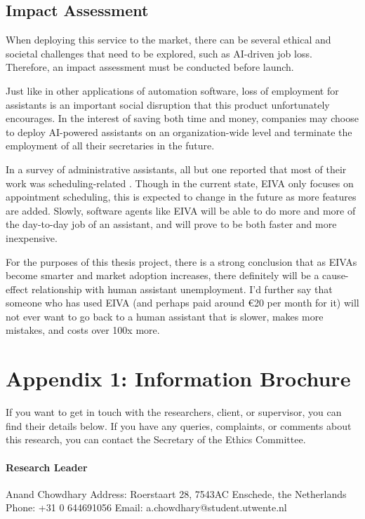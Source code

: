 \documentclass{article}
\begin{document}
\subsection{Impact Assessment}

When deploying this service to the market, there can be several ethical and societal challenges that need to be explored, such as AI-driven job loss. Therefore, an impact assessment must be conducted before launch.

Just like in other applications of automation software, loss of employment for assistants is an important social disruption that this product unfortunately encourages. In the interest of saving both time and money, companies may choose to deploy AI-powered assistants on an organization-wide level and terminate the employment of all their secretaries in the future.

In a survey of administrative assistants, all but one reported that most of their work was scheduling-related \cite{erickson_assistance:_2008}. Though in the current state, EIVA only focuses on appointment scheduling, this is expected to change in the future as more features are added. Slowly, software agents like EIVA will be able to do more and more of the day-to-day job of an assistant, and will prove to be both faster and more inexpensive.

For the purposes of this thesis project, there is a strong conclusion that as EIVAs become smarter and market adoption increases, there definitely will be a cause-effect relationship with human assistant unemployment. I'd further say that someone who has used EIVA (and perhaps paid around €20 per month for it) will not ever want to go back to a human assistant that is slower, makes more mistakes, and costs over 100x more.

\newpage

\cleardoublepage
{}
\setcounter{page}{\thesavepage}

\section*{Appendix 1: Information Brochure}

If you want to get in touch with the researchers, client, or supervisor, you can find their details below. If you have any queries, complaints, or comments about this research, you can contact the Secretary of the Ethics Committee.

\paragraph{Research Leader}
Anand Chowdhary\newline
Address: Roerstaart 28, 7543AC Enschede, the Netherlands\newline
Phone: +31 0 644691056\newline
Email: a.chowdhary@student.utwente.nl
\end{document}
